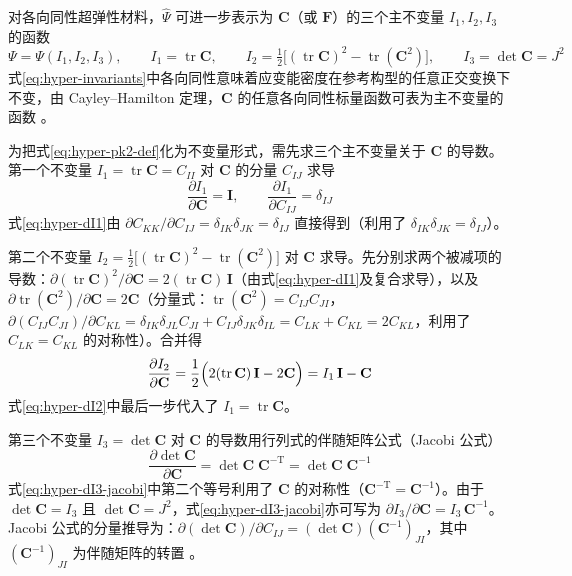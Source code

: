 对各向同性超弹性材料，$\hat{\Psi}$ 可进一步表示为 $\mathbf{C}$（或 $\mathbf{F}$）的三个主不变量 $I_1,I_2,I_3$ 的函数
\begin{equation}
  \Psi=\Psi(I_1,I_2,I_3),\qquad
  I_1=\operatorname{tr}\mathbf{C},\qquad
  I_2=\tfrac{1}{2}\bigl[(\operatorname{tr}\mathbf{C})^{2}-\operatorname{tr}(\mathbf{C}^{2})\bigr],\qquad
  I_3=\det\mathbf{C}=J^{2}
  \label{eq:hyper-invariants}
\end{equation}
式\eqref{eq:hyper-invariants}中各向同性意味着应变能密度在参考构型的任意正交变换下不变，由 Cayley--Hamilton 定理，$\mathbf{C}$ 的任意各向同性标量函数可表为主不变量的函数 \cite{Ogden1997}。

为把式\eqref{eq:hyper-pk2-def}化为不变量形式，需先求三个主不变量关于 $\mathbf{C}$ 的导数。第一个不变量 $I_1=\operatorname{tr}\mathbf{C}=C_{II}$ 对 $\mathbf{C}$ 的分量 $C_{IJ}$ 求导
\begin{equation}
  \frac{\partial I_1}{\partial\mathbf{C}}=\mathbf{I},
  \qquad
  \frac{\partial I_1}{\partial C_{IJ}}=\delta_{IJ}
  \label{eq:hyper-dI1}
\end{equation}
式\eqref{eq:hyper-dI1}由 $\partial C_{KK}/\partial C_{IJ}=\delta_{IK}\delta_{JK}=\delta_{IJ}$ 直接得到（利用了 $\delta_{IK}\delta_{JK}=\delta_{IJ}$）。

第二个不变量 $I_2=\tfrac{1}{2}\bigl[(\operatorname{tr}\mathbf{C})^{2}-\operatorname{tr}(\mathbf{C}^{2})\bigr]$ 对 $\mathbf{C}$ 求导。先分别求两个被减项的导数：$\partial(\operatorname{tr}\mathbf{C})^{2}/\partial\mathbf{C}=2(\operatorname{tr}\mathbf{C})\,\mathbf{I}$（由式\eqref{eq:hyper-dI1}及复合求导），以及 $\partial\operatorname{tr}(\mathbf{C}^{2})/\partial\mathbf{C}=2\mathbf{C}$（分量式：$\operatorname{tr}(\mathbf{C}^{2})=C_{IJ}C_{JI}$，$\partial(C_{IJ}C_{JI})/\partial C_{KL}=\delta_{IK}\delta_{JL}C_{JI}+C_{IJ}\delta_{JK}\delta_{IL}=C_{LK}+C_{KL}=2C_{KL}$，利用了 $C_{LK}=C_{KL}$ 的对称性）。合并得
\begin{equation}
  \frac{\partial I_2}{\partial\mathbf{C}}
  =\frac{1}{2}\Bigl(2(\operatorname{tr}\mathbf{C})\,\mathbf{I}-2\mathbf{C}\Bigr)
  =I_1\,\mathbf{I}-\mathbf{C}
  \label{eq:hyper-dI2}
\end{equation}
式\eqref{eq:hyper-dI2}中最后一步代入了 $I_1=\operatorname{tr}\mathbf{C}$。

第三个不变量 $I_3=\det\mathbf{C}$ 对 $\mathbf{C}$ 的导数用行列式的伴随矩阵公式（Jacobi 公式）
\begin{equation}
  \frac{\partial\det\mathbf{C}}{\partial\mathbf{C}}=\det\mathbf{C}\;\mathbf{C}^{-\mathrm{T}}=\det\mathbf{C}\;\mathbf{C}^{-1}
  \label{eq:hyper-dI3-jacobi}
\end{equation}
式\eqref{eq:hyper-dI3-jacobi}中第二个等号利用了 $\mathbf{C}$ 的对称性（$\mathbf{C}^{-\mathrm{T}}=\mathbf{C}^{-1}$）。由于 $\det\mathbf{C}=I_3$ 且 $\det\mathbf{C}=J^{2}$，式\eqref{eq:hyper-dI3-jacobi}亦可写为 $\partial I_3/\partial\mathbf{C}=I_3\,\mathbf{C}^{-1}$。Jacobi 公式的分量推导为：$\partial(\det\mathbf{C})/\partial C_{IJ}=(\det\mathbf{C})(\mathbf{C}^{-1})_{JI}$，其中 $(\mathbf{C}^{-1})_{JI}$ 为伴随矩阵的转置 \cite{Ogden1997}。

